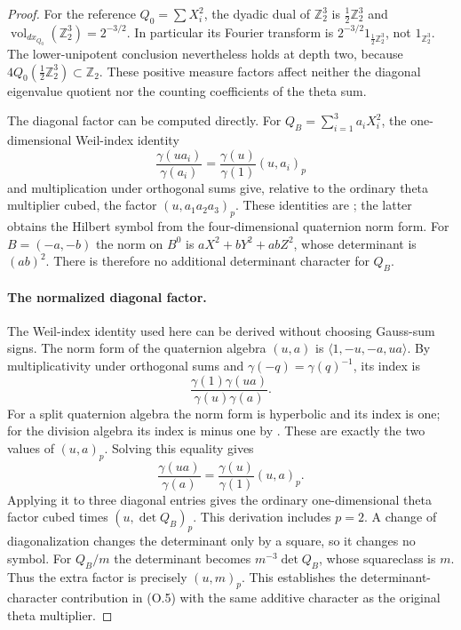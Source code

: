 \documentclass[11pt]{article}
\theoremstyle{definition}
\theoremstyle{remark}
\begin{document}
\begin{proof}
For the reference $Q_0=\sum X_i^2$, the dyadic dual of
$\mathbb Z_2^3$ is $\tfrac12\mathbb Z_2^3$ and
$\operatorname{vol}_{dx_{Q_0}}(\mathbb Z_2^3)=2^{-3/2}$.
In particular its Fourier transform is
$2^{-3/2}1_{\frac12\mathbb Z_2^3}$, not $1_{\mathbb Z_2^3}$.
The lower-unipotent conclusion nevertheless holds at depth two,
because $4Q_0(\frac12\mathbb Z_2^3)\subset\mathbb Z_2$.
These positive measure factors affect neither the diagonal
eigenvalue quotient nor the counting coefficients of the theta sum.


The diagonal factor can be computed directly.  For
$Q_B=\sum_{i=1}^3 a_iX_i^2$, the one-dimensional Weil-index identity
\[
 \frac{\gamma(ua_i)}{\gamma(a_i)}
       =\frac{\gamma(u)}{\gamma(1)}(u,a_i)_p
\]
and multiplication under orthogonal sums give, relative to the
ordinary theta multiplier cubed, the factor
$(u,a_1a_2a_3)_p$.  These identities are \cite[II.25 and II.28]{weil};
the latter obtains the Hilbert symbol from the four-dimensional
quaternion norm form.  For $B=(-a,-b)$ the norm on $B^0$ is
$aX^2+bY^2+abZ^2$, whose determinant is $(ab)^2$.
There is therefore no additional determinant character for $Q_B$.
\paragraph{The normalized diagonal factor.}
The Weil-index identity used here can be derived without choosing
Gauss-sum signs. The norm form of the quaternion algebra $(u,a)$
is $\langle1,-u,-a,ua\rangle$. By multiplicativity under orthogonal
sums and $\gamma(-q)=\gamma(q)^{-1}$, its index is
\[
 \frac{\gamma(1)\gamma(ua)}{\gamma(u)\gamma(a)}.
\]
For a split quaternion algebra the norm form is hyperbolic and its
index is one; for the division algebra its index is minus one by
\cite[II.28, Proposition 4]{weil}. These are exactly the two values
of $(u,a)_p$. Solving this equality gives
\[
 \frac{\gamma(ua)}{\gamma(a)}
   =\frac{\gamma(u)}{\gamma(1)}(u,a)_p.
\]
Applying it to three diagonal entries gives the ordinary
one-dimensional theta factor cubed times $(u,\det Q_B)_p$.
This derivation includes $p=2$. A change of diagonalization changes
the determinant only by a square, so it changes no symbol.
For $Q_B/m$ the determinant becomes $m^{-3}\det Q_B$, whose
squareclass is $m$. Thus the extra factor is precisely $(u,m)_p$.
This establishes the determinant-character contribution in (O.5)
with the same additive character as the original theta multiplier.


\end{proof}
\end{document}
